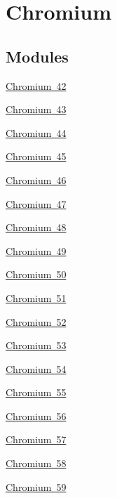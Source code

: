 \hypertarget{group___isotope_const-_chromium}{}\section{Chromium}
\label{group___isotope_const-_chromium}
\subsection*{Modules}
\begin{DoxyCompactItemize}
\item 
\mbox{\hyperlink{group___isotope_const-_chromium-_cr42}{Chromium 42}}
\item 
\mbox{\hyperlink{group___isotope_const-_chromium-_cr43}{Chromium 43}}
\item 
\mbox{\hyperlink{group___isotope_const-_chromium-_cr44}{Chromium 44}}
\item 
\mbox{\hyperlink{group___isotope_const-_chromium-_cr45}{Chromium 45}}
\item 
\mbox{\hyperlink{group___isotope_const-_chromium-_cr46}{Chromium 46}}
\item 
\mbox{\hyperlink{group___isotope_const-_chromium-_cr47}{Chromium 47}}
\item 
\mbox{\hyperlink{group___isotope_const-_chromium-_cr48}{Chromium 48}}
\item 
\mbox{\hyperlink{group___isotope_const-_chromium-_cr49}{Chromium 49}}
\item 
\mbox{\hyperlink{group___isotope_const-_chromium-_cr50}{Chromium 50}}
\item 
\mbox{\hyperlink{group___isotope_const-_chromium-_cr51}{Chromium 51}}
\item 
\mbox{\hyperlink{group___isotope_const-_chromium-_cr52}{Chromium 52}}
\item 
\mbox{\hyperlink{group___isotope_const-_chromium-_cr53}{Chromium 53}}
\item 
\mbox{\hyperlink{group___isotope_const-_chromium-_cr54}{Chromium 54}}
\item 
\mbox{\hyperlink{group___isotope_const-_chromium-_cr55}{Chromium 55}}
\item 
\mbox{\hyperlink{group___isotope_const-_chromium-_cr56}{Chromium 56}}
\item 
\mbox{\hyperlink{group___isotope_const-_chromium-_cr57}{Chromium 57}}
\item 
\mbox{\hyperlink{group___isotope_const-_chromium-_cr58}{Chromium 58}}
\item 
\mbox{\hyperlink{group___isotope_const-_chromium-_cr59}{Chromium 59}}

\end{DoxyCompactItemize}
